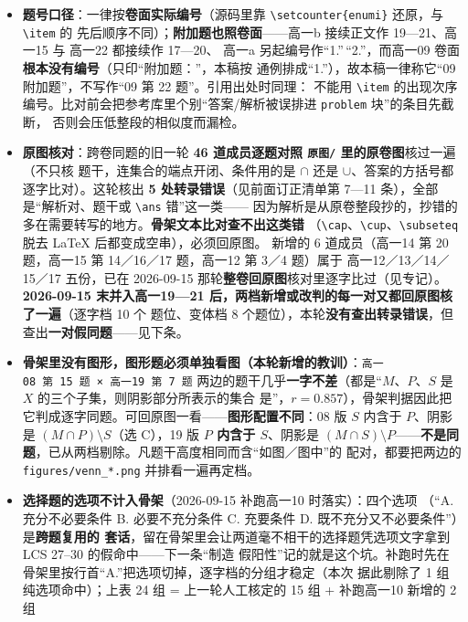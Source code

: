\documentclass[a4paper,11pt]{article}
\begin{document}
\begin{itemize}
  \textbf{两个曾导致漏检的口径陷阱}（已修，记此备查）：① 两边必须用\textbf{同一套}归一化------参考库
  那侧若只做骨架化、不先剥 LaTeX 命令，\texttt{\textbackslash{}operatorname\{card\}} 会留下 \texttt{operatornamecard}
  这类残渣，与已经剥干净的高一文本对不上，实测把同一道题的相似度从 38 压到 12；
  ② 预筛不能用``共享片段数 top-K''截断，候选一多真匹配就会被挤出榜外。
\item
  \textbf{题号口径}：一律按\textbf{卷面实际编号}（源码里靠 \texttt{\textbackslash{}setcounter\{enumi\}} 还原，与 \texttt{\textbackslash{}item} 的
  先后顺序不同）；\textbf{附加题也照卷面}------高一b 接续正文作 19---21、高一15 与 高一22 都接续作 17---20、
  高一a 另起编号作``1.''\,``2.''，而高一09 卷面\textbf{根本没有编号}（只印``附加题：''，本稿按
  通例排成``1.''），故本稿一律称它``09 附加题''，不写作``09 第 22 题''。引用出处时同理：
  不能用 \texttt{\textbackslash{}item} 的出现次序编号。比对前会把参考库里个别``答案/解析被误排进 \texttt{problem} 块''的条目先截断，
  否则会压低整段的相似度而漏检。
\item
  \textbf{原图核对}：跨卷同题的旧一轮 \textbf{46 道成员逐题对照 \texttt{原图/\allowbreak{}} 里的原卷图}核过一遍（不只核
  题干，连集合的端点开闭、条件用的是 \(\cap\) 还是 \(\cup\)、答案的方括号都逐字比对）。这轮核出
  \textbf{5 处转录错误}（见前面订正清单第 7---11 条），全部是``解析对、题干或 \texttt{\textbackslash{}ans} 错''这一类------
  因为解析是从原卷整段抄的，抄错的多在需要转写的地方。\textbf{骨架文本比对查不出这类错}
  （\texttt{\textbackslash{}cap}、\texttt{\textbackslash{}cup}、\texttt{\textbackslash{}subseteq} 脱去 LaTeX 后都变成空串），必须回原图。
  新增的 6 道成员（高一14 第 20 题，高一15 第 14／16／17 题，高一12 第 3／4 题）属于
  高一12／13／14／15／17 五份，已在 2026-09-15 那轮\textbf{整卷回原图}核对里逐字比过（见专记）。
  \textbf{2026-09-15 末并入高一19---21 后，两档新增或改判的每一对又都回原图核了一遍}（逐字档 10 个
  题位、变体档 8 个题位），本轮\textbf{没有查出转录错误}，但查出\textbf{一对假同题}------见下条。
\item
  \textbf{骨架里没有图形，图形题必须单独看图（本轮新增的教训）}：\texttt{高一08\ 第\ 15\ 题\ ×\ 高一19\ 第\ 7\ 题}
  两边的题干几乎\textbf{一字不差}（都是``\(M\)、\(P\)、\(S\) 是 \(X\) 的三个子集，则阴影部分所表示的集合
  是''，\(r=0.857\)），骨架判据因此把它判成逐字同题。可回原图一看------\textbf{图形配置不同}：08 版
  \(S\) 内含于 \(P\)、阴影是 \((M\cap P)\setminus S\)（选 C），19 版 \textbf{\(P\) 内含于 \(S\)}、阴影是
  \((M\cap S)\setminus P\)------\textbf{不是同题}，已从两档剔除。凡题干高度相同而含``如图／图中''的
  配对，都要把两边的 \texttt{figures/\allowbreak{}venn\_*.png} 并排看一遍再定档。
\item
  \textbf{选择题的选项不计入骨架}（2026-09-15 补跑高一10 时落实）：四个选项
  （``A. 充分不必要条件 B. 必要不充分条件 C. 充要条件 D. 既不充分又不必要条件''）是\textbf{跨题复用的
  套话}，留在骨架里会让两道毫不相干的选择题凭选项文字拿到 LCS 27--30 的假命中------下一条``制造
  假阳性''记的就是这个坑。补跑时先在骨架里按行首``A.''把选项切掉，逐字档的分组才稳定（本次
  据此剔除了 1 组纯选项命中）；上表 24 组 = 上一轮人工核定的 15 组 + 补跑高一10 新增的 2 组


\end{itemize}
\end{document}

